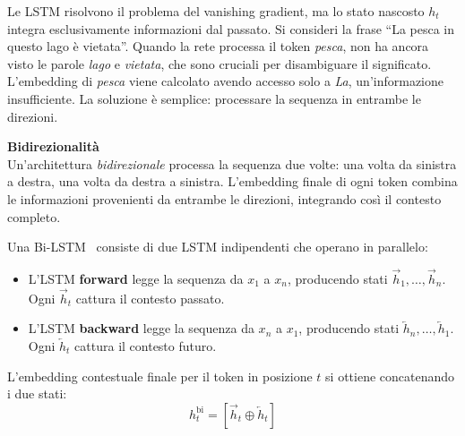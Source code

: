 Le LSTM risolvono il problema del vanishing gradient, ma lo stato nascosto $h_t$ integra esclusivamente informazioni dal passato. Si consideri la frase ``La pesca in questo lago è vietata''. Quando la rete processa il token \textit{pesca}, non ha ancora visto le parole \textit{lago} e \textit{vietata}, che sono cruciali per disambiguare il significato. L'embedding di \textit{pesca} viene calcolato avendo accesso solo a \textit{La}, un'informazione insufficiente.
La soluzione è semplice: processare la sequenza in entrambe le direzioni.
\begin{notebox}
\textbf{Bidirezionalità}\\
Un'architettura \textit{bidirezionale} processa la sequenza due volte: una volta da sinistra a destra, una volta da destra a sinistra. L'embedding finale di ogni token combina le informazioni provenienti da entrambe le direzioni, integrando così il contesto completo.
\end{notebox}
Una Bi-LSTM~\parencite{schuster1997bidirectional} consiste di due LSTM indipendenti che operano in parallelo:
\begin{itemize}
    \item L'LSTM \textbf{forward} legge la sequenza da $x_1$ a $x_n$, producendo stati $\overrightarrow{h}_1, \dots, \overrightarrow{h}_n$. Ogni $\overrightarrow{h}_t$ cattura il contesto passato.
    \item L'LSTM \textbf{backward} legge la sequenza da $x_n$ a $x_1$, producendo stati $\overleftarrow{h}_n, \dots, \overleftarrow{h}_1$. Ogni $\overleftarrow{h}_t$ cattura il contesto futuro.
\end{itemize}
L'embedding contestuale finale per il token in posizione $t$ si ottiene concatenando i due stati:
\begin{equation}
h_t^{\text{bi}} = [\overrightarrow{h}_t \oplus \overleftarrow{h}_t]
\end{equation}

